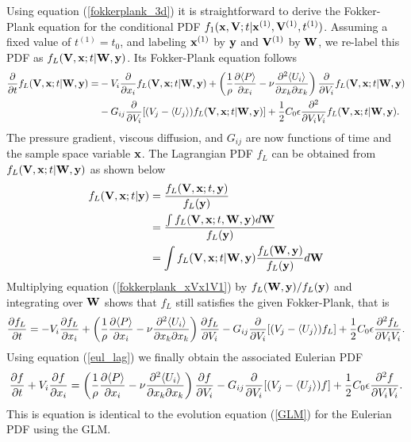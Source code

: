 \documentclass[oneside,a4paper,11pt]{report}
\begin{document}
Using equation (\ref{fokkerplank_3d}) it is straightforward to derive the Fokker-Plank equation for the conditional PDF $f_1(\mathbf{x},\mathbf{V};t | \mathbf{x}^{(1)}, \mathbf{V}^{(1)}, t^{(1)})$. Assuming a fixed value of $t^{(1)} = t_0$, and labeling $\mathbf{x}^{(1)}$ by $\mathbf{y}$ and $\mathbf{V}^{(1)}$ by $\mathbf{W}$, we re-label this PDF as $f_L(\mathbf{V}, \mathbf{x}; t | \mathbf{W}, \mathbf{y})$. Its Fokker-Plank equation follows
\begin{align}
\label{fokkerplank_xVx1V1}
\frac{\partial}{\partial t} f_L(\mathbf{V}, \mathbf{x}; t | \mathbf{W}, \mathbf{y}) = &-V_i\frac{\partial} {\partial x_i}f_L(\mathbf{V}, \mathbf{x}; t | \mathbf{W}, \mathbf{y}) + \left (\frac{1}{\rho} \frac{\partial \langle P \rangle}{\partial x_i}  -\nu \frac{\partial^2 \langle U_i \rangle}{\partial x_k \partial x_k} \right ) \frac{\partial}{\partial V_i}f_L(\mathbf{V}, \mathbf{x}; t | \mathbf{W}, \mathbf{y}) \nonumber \\
&- G_{ij}\frac{\partial}{\partial V_i} [(V_j - \langle U_j \rangle) f_L(\mathbf{V}, \mathbf{x}; t | \mathbf{W}, \mathbf{y}) ] + \frac{1}{2} C_0 \epsilon \frac{\partial ^2}{\partial V_i V_i} f_L(\mathbf{V}, \mathbf{x}; t | \mathbf{W}, \mathbf{y} ).
\end{align}
The pressure gradient, viscous diffusion, and $G_{ij}$ are now functions of time and the sample space variable $\mathbf{x}$. The Lagrangian PDF $f_L$ can be obtained from $f_L(\mathbf{V}, \mathbf{x}; t| \mathbf{W}, \mathbf{y})$ as shown below
\begin{align}
f_L(\mathbf{V}, \mathbf{x}; t | \mathbf{y}) &= \frac{ f_L(\mathbf{V}, \mathbf{x}; t, \mathbf{y})}{f_L(\mathbf{y})} \nonumber \\
& = \frac{ \int f_L(\mathbf{V}, \mathbf{x}; t, \mathbf{W}, \mathbf{y}) d\mathbf{W} }{f_L(\mathbf{y})} \nonumber \\
& =  \int f_L(\mathbf{V}, \mathbf{x}; t | \mathbf{W}, \mathbf{y}) \frac{ f_L(\mathbf{W}, \mathbf{y}) }{  f_L(\mathbf{y})  } d\mathbf{W} 
\end{align}
Multiplying equation (\ref{fokkerplank_xVx1V1}) by $f_L(\mathbf{W}, \mathbf{y}) / f_L(\mathbf{y})$ and integrating over $\mathbf{W}$ shows that $f_L$ still satisfies the given Fokker-Plank, that is
\begin{equation}
\frac{\partial f_L}{\partial t} = -V_i\frac{\partial f_L} {\partial x_i} + \left ( \frac{1}{\rho} \frac{\partial \langle P \rangle}{\partial x_i} - \nu \frac{\partial^2 \langle U_i \rangle}{\partial x_k \partial x_k} \right ) \frac{\partial f_L}{\partial V_i} - G_{ij}\frac{\partial}{\partial V_i} [(V_j - \langle U_j \rangle) f_L] + \frac{1}{2} C_0 \epsilon \frac{\partial ^2 f_L}{\partial V_i V_i}.
\end{equation}
Using equation (\ref{eul_lag}) we finally obtain the associated Eulerian PDF
\begin{equation}
\label{GLM2}
\frac{\partial f}{\partial t}  + V_i\frac{\partial f} {\partial x_i} =  \left ( \frac{1}{\rho} \frac{\partial \langle P \rangle}{\partial x_i} - \nu \frac{\partial^2 \langle U_i \rangle}{\partial x_k \partial x_k} \right ) \frac{\partial f}{\partial V_i} - G_{ij}\frac{\partial}{\partial V_i} [(V_j - \langle U_j \rangle) f] + \frac{1}{2} C_0 \epsilon \frac{\partial ^2 f}{\partial V_i V_i}.
\end{equation}
This is equation is identical to the evolution equation (\ref{GLM}) for the Eulerian PDF using the GLM.
\end{document}
